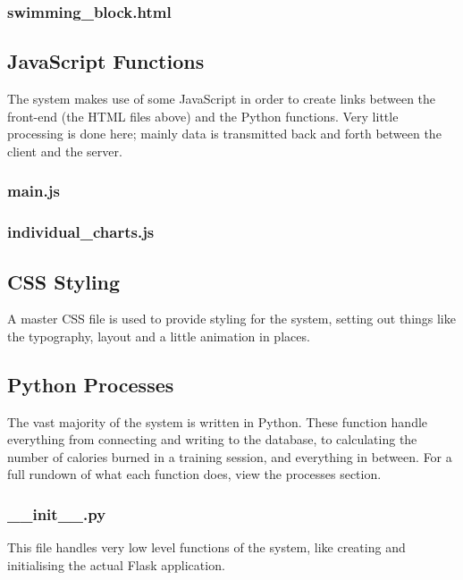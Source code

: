 \documentclass{article}[12pt,a4paper]
\begin{document}
\subsubsection{swimming\_block.html}



\subsection{JavaScript Functions}
The system makes use of some JavaScript in order to create links between the front-end (the HTML files above) and the Python functions. Very little processing is done here; mainly data is transmitted back and forth between the client and the server.

\subsubsection{main.js}


\subsubsection{individual\_charts.js}



\subsection{CSS Styling}
A master CSS file is used to provide styling for the system, setting out things like the typography, layout and a little animation in places.



\subsection{Python Processes}
The vast majority of the system is written in Python. These function handle everything from connecting and writing to the database, to calculating the number of calories burned in a training session, and everything in between. For a full rundown of what each function does, view the processes section.

\subsubsection{\_\_init\_\_.py}
This file handles very low level functions of the system, like creating and initialising the actual Flask application.

\end{document}
